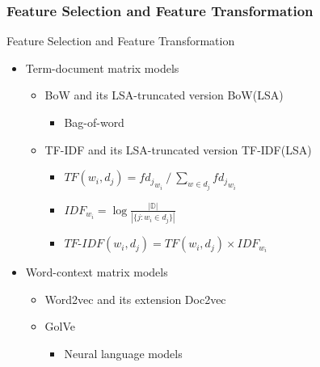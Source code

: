 \documentclass[mathserif]{beamer}
\DeclareMathOperator*{\divby}{/}
\begin{document}
\subsubsection{Feature Selection and Feature Transformation}
\begin{frame}{Feature Selection and Feature Transformation}
	\begin{itemize}
	\item Term-document matrix models
		\begin{itemize}
		\item BoW and its LSA-truncated version BoW(LSA)
			\begin{itemize}
			\item Bag-of-word
			\end{itemize}
		\item TF-IDF and its LSA-truncated version TF-IDF(LSA)
			\begin{itemize}
			\item $TF(w_i,d_j) = f{d_j}_{w_i} \divby \sum_{w \in d_j} f{d_j}_{w_i}$
			\item[] $IDF_{w_i} = \log \frac{|\mathbb{D}|}{|\{j:w_i \in d_j\}|}$
			\item[] $TF\text{-}IDF(w_i,d_j) = TF(w_i,d_j) \times IDF_{w_i}$
			\end{itemize}
		\end{itemize}
	\item Word-context matrix models
		\begin{itemize}
		\item Word2vec\cite{Mikolov2013ord2vec} and its extension Doc2vec\cite{le2014doc2vec}
		\item GolVe\cite{Pennington2014glove}
			\begin{itemize}
			\item Neural language models
			\end{itemize}
		\end{itemize}
	\end{itemize}
\end{frame}
\end{document}

